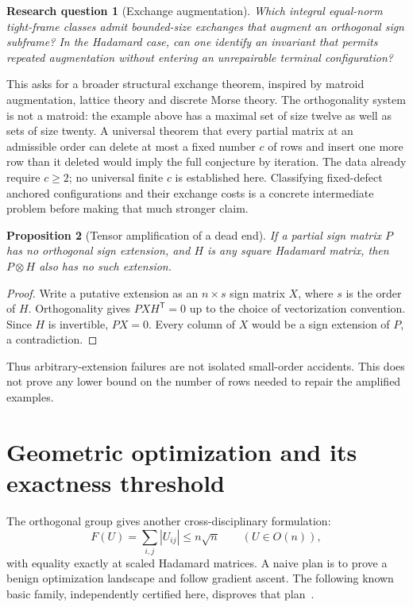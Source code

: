 \documentclass[11pt]{article}
\newtheorem{proposition}{Proposition}[section]
\newtheorem{question}[proposition]{Research question}
\begin{document}
\begin{question}[Exchange augmentation]\label{q:exchange}
Which integral equal-norm tight-frame classes admit bounded-size
exchanges that augment an orthogonal sign subframe? In the Hadamard
case, can one identify an invariant that permits repeated augmentation
without entering an unrepairable terminal configuration?
\end{question}
This asks for a broader structural exchange theorem, inspired by
matroid augmentation, lattice theory and discrete Morse theory. The
orthogonality system is not a matroid: the example above has a maximal
set of size twelve as well as sets of size twenty. A universal theorem
that every partial matrix at an admissible order can delete at most a
fixed number $c$ of rows and insert one more row than it deleted would
imply the full conjecture by iteration. The data already require
$c\ge2$; no universal finite $c$ is established here. Classifying
fixed-defect anchored configurations and their exchange costs is a
concrete intermediate problem before making that much stronger claim.

\begin{proposition}[Tensor amplification of a dead end]
If a partial sign matrix $P$ has no orthogonal sign extension, and $H$
is any square Hadamard matrix, then $P\otimes H$ also has no such
extension.
\end{proposition}
\begin{proof}
Write a putative extension as an $n\times s$ sign matrix $X$, where
$s$ is the order of $H$. Orthogonality gives $PXH^{\mathsf T}=0$ up to
the choice of vectorization convention. Since $H$ is invertible,
$PX=0$. Every column of $X$ would be a sign extension of $P$, a
contradiction.
\end{proof}
Thus arbitrary-extension failures are not isolated small-order accidents.
This does not prove any lower bound on the number of rows needed to
repair the amplified examples.

\section{Geometric optimization and its exactness threshold}
The orthogonal group gives another cross-disciplinary formulation:
\[
 F(U)=\sum_{i,j}|U_{ij}|\le n\sqrt n\qquad(U\in O(n)),
\]
with equality exactly at scaled Hadamard matrices. A naive plan is to
prove a benign optimization landscape and follow gradient ascent.
The following known basic family, independently certified here,
disproves that plan~\cite{Almost}.
\end{document}
